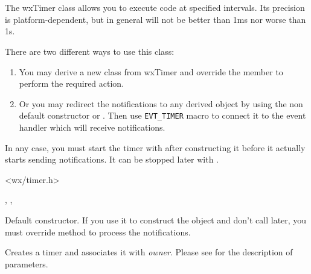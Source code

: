 \section{}\label{wxtimer}

The wxTimer class allows you to execute code at specified intervals. Its
precision is platform-dependent, but in general will not be better than 1ms nor
worse than 1s.

There are two different ways to use this class:

\begin{enumerate}
\item You may derive a new class from wxTimer and override the 
 member to perform the required action.
\item Or you may redirect the notifications to any 
 derived object by using the non default
constructor or . Then use {\tt EVT\_TIMER} 
macro to connect it to the event handler which will receive 
 notifications.
\end{enumerate}

In any case, you must start the timer with  
after constructing it before it actually starts sending notifications. It can
be stopped later with .




<wx/timer.h>


, , 


\label{wxtimerwxtimer}


Default constructor. If you use it to construct the object and don't call 
 later, you must override 
 method to process the notifications.


Creates a timer and associates it with {\it owner}. Please see 
 for the description of parameters.

